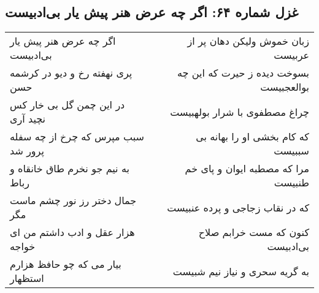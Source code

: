 \begin{center}
\section*{غزل شماره ۶۴: اگر چه عرض هنر پیش یار بی‌ادبیست}
\label{sec:sh064}
\begin{longtable}{l p{0.5cm} r}
اگر چه عرض هنر پیش یار بی‌ادبیست
&&
زبان خموش ولیکن دهان پر از عربیست
\\
پری نهفته رخ و دیو در کرشمه حسن
&&
بسوخت دیده ز حیرت که این چه بوالعجبیست
\\
در این چمن گل بی خار کس نچید آری
&&
چراغ مصطفوی با شرار بولهبیست
\\
سبب مپرس که چرخ از چه سفله پرور شد
&&
که کام بخشی او را بهانه بی سببیست
\\
به نیم جو نخرم طاق خانقاه و رباط
&&
مرا که مصطبه ایوان و پای خم طنبیست
\\
جمال دختر رز نور چشم ماست مگر
&&
که در نقاب زجاجی و پرده عنبیست
\\
هزار عقل و ادب داشتم من ای خواجه
&&
کنون که مست خرابم صلاح بی‌ادبیست
\\
بیار می که چو حافظ هزارم استظهار
&&
به گریه سحری و نیاز نیم شبیست
\\
\end{longtable}
\end{center}
